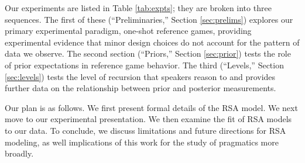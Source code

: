 \documentclass[man,noapacite]{apa2}
\begin{document}
Our experiments are listed in Table \ref{tab:expts}; they are broken into three sequences. The first of these (``Preliminaries,'' Section \ref{sec:prelims}) explores our primary experimental paradigm, one-shot reference games, providing experimental evidence that minor design choices do not account for the pattern of data we observe. The second section (``Priors,'' Section \ref{sec:prior}) tests the role of prior expectations in reference game behavior. The third (``Levels,'' Section \ref{sec:levels}) tests the level of recursion that speakers reason to and provides further data on the relationship between prior and posterior measurements.

Our plan is as follows. We first present formal details of the RSA model. We next move to our experimental presentation. We then examine the fit of RSA models to our data. To conclude, we discuss limitations and future directions for RSA modeling, as well implications of this work for the study of pragmatics more broadly.
\end{document}
